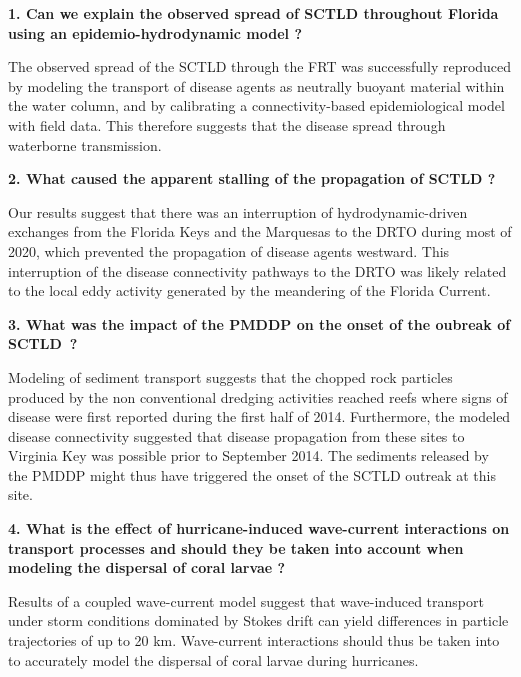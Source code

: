\begin{list}{}{%
    \setlength{\leftmargin}{0in}%
    }
    \item \textbf{1. Can we explain the observed spread of SCTLD throughout Florida using an epidemio-hydrodynamic model ?}
    \begin{list}{}{\setlength{\topsep}{0pt}}
        \item The observed spread of the SCTLD through the FRT was successfully reproduced by modeling the transport of disease agents as neutrally buoyant material within the water column, and by calibrating a connectivity-based epidemiological model with field data. This therefore suggests that the disease spread through waterborne transmission. 
    \end{list}
    \item \textbf{2. What caused the apparent stalling of the propagation of SCTLD ?}
    \begin{list}{}{\setlength{\topsep}{0pt}}
        \item Our results suggest that there was an interruption of hydrodynamic-driven exchanges from the Florida Keys and the Marquesas to the DRTO during most of 2020, which prevented the propagation of disease agents westward. This interruption of the disease connectivity pathways to the DRTO was likely related to the local eddy activity generated by the meandering of the Florida Current.
    \end{list}
    \item \textbf{3. What was the impact of the PMDDP on the onset of the oubreak of SCTLD~?}
    \begin{list}{}{\setlength{\topsep}{0pt}}
        \item Modeling of sediment transport suggests that the chopped rock particles produced by the non conventional dredging activities reached reefs where signs of disease were first reported during the first half of 2014. Furthermore, the modeled disease connectivity suggested that disease propagation from these sites to Virginia Key was possible prior to September 2014. The sediments released by the PMDDP might thus have triggered the onset of the SCTLD outreak at this site.
    \end{list}
    \item  \textbf{4. What is the effect of hurricane-induced wave-current interactions on transport processes and should they be taken into account when modeling the dispersal of coral larvae ?}
    \begin{list}{}{\setlength{\topsep}{0pt}}
        \item Results of a coupled wave-current model suggest that wave-induced transport under storm conditions dominated by Stokes drift can yield differences in particle trajectories of up to 20 km. Wave-current interactions should thus be taken into to accurately model the dispersal of coral larvae during hurricanes.
    \end{list}
\end{list}


